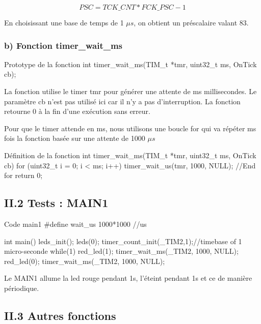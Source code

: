 {\begin{equation}
PSC = TCK\_CNT*FCK\_PSC-1
\end{equation}

En choisissant une base de temps de 1 $\mu s$, on obtient un préscalaire valant 83.


\newpage
\subsubsection{b) Fonction timer\_wait\_ms}
\begin{Cpp}{Prototype de la fonction} 
int timer_wait_ms(TIM_t *tmr, uint32_t ms, OnTick cb);
\end{Cpp}

La fonction utilise le timer tmr pour générer une attente de ms millisecondes. Le paramètre cb n'est pas utilisé ici car il n'y a pas d'interruption. La fonction retourne 0 à la fin d'une exécution sans erreur.


Pour que le timer attende en ms, nous utilisons une boucle for qui va répéter ms fois la fonction  basée sur une attente de 1000 $\mu s$ \\


\begin{Cpp}{Définition de la fonction} 
int timer_wait_ms(TIM_t *tmr, uint32_t ms, OnTick cb) 
{
		for (uint32_t i = 0; i < ms; i++)
		{
			timer_wait_us(tmr, 1000, NULL);
		}//End for
	    return 0;
}
\end{Cpp}





\newpage
\subsection{II.2 Tests : MAIN1}

\begin{Cpp}{Code main1} 
#define wait_us           1000*1000   //us

int main()
{    
    leds_init();
    leds(0);
    timer_count_init(_TIM2,1);//timebase of 1 micro-seconde
    while(1)
    {
        red_led(1);
        timer_wait_ms(_TIM2, 1000, NULL);
        red_led(0);
        timer_wait_ms(_TIM2, 1000, NULL);
    }        
}   
\end{Cpp}

Le MAIN1 allume la led rouge pendant 1s, l'éteint pendant 1s et ce de manière périodique.


\newpage
\subsection{II.3 Autres fonctions}
}
